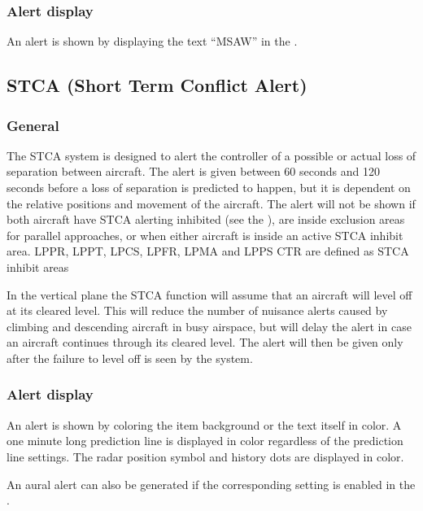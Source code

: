 \documentclass[a4paper,oneside,11pt]{memoir}
\begin{document}
\subsubsection*{Alert display}

An alert is shown by displaying the text “MSAW” in the .

\subsection{STCA (Short Term Conflict Alert)}
\label{tool:STCA}
\subsubsection*{General}

The STCA system is designed to alert the controller of a possible or actual loss of separation between aircraft. The alert is given between 60 seconds and 120 seconds before a loss of separation is predicted to happen, but it is dependent on the relative positions and movement of the aircraft. The alert will not be shown if both aircraft have STCA alerting inhibited (see the ), are inside exclusion areas for parallel approaches, or when either aircraft is inside an active STCA inhibit area. LPPR, LPPT, LPCS, LPFR, LPMA and LPPS CTR are defined as STCA inhibit areas

\bigskip

In the vertical plane the STCA function will assume that an aircraft will level off at its cleared level. This will reduce the number of nuisance alerts caused by climbing and descending aircraft in busy airspace, but will delay the alert in case an aircraft continues through its cleared level. The alert will then be given only after the failure to level off is seen by the system.

\subsubsection*{Alert display}

An alert is shown by coloring the  item background or the text itself in  color. A one minute long prediction line is displayed in  color regardless of the prediction line settings. The radar position symbol and history dots are displayed in  color.

\bigskip

An aural alert can also be generated if the corresponding setting is enabled in the .
\end{document}
